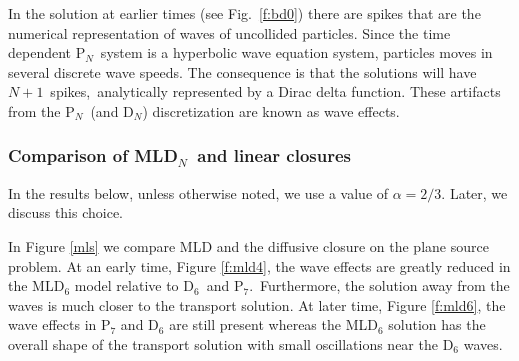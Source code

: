 \documentclass[review]{elsarticle}
\newcommand{\pn}{P$_N$}
\newcommand{\dn}{D$_N$}
\begin{document}
\begin{figure}[ht!]
\end{figure}

{
In the solution at earlier times (see Fig.~\ref{f:bd0}) there are spikes that are the numerical representation of waves of uncollided particles. Since the time dependent \pn\ system is a hyperbolic wave equation system, particles moves in several discrete wave speeds. The consequence is that the solutions will have $N+1$~spikes,~analytically represented by a Dirac delta function. These artifacts from the \pn\ (and \dn) discretization are known as wave effects\cite{brunner_app_rad_trans}.
	}

\subsubsection{Comparison of ML\dn\ and linear closures}
In the results below, unless otherwise noted, we use a value of $\alpha = 2/3$. Later, we discuss this choice.

In Figure  \ref{mls} we compare MLD and the diffusive closure on the plane source problem. At an early time, Figure \ref{f:mld4}, the wave effects are greatly reduced in the MLD$_6$ model relative to D$_6$\ and P$_7$.\ Furthermore, the solution away from the waves is much closer to the transport solution. At later time, Figure \ref{f:mld6}, the wave effects in P$_7$ and D$_6$ are still present whereas the MLD$_6$ solution has the overall shape of the transport solution with small oscillations near the D$_6$ waves. 
\end{document}
